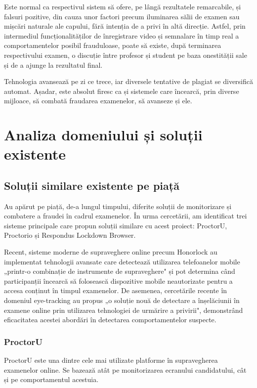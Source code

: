 \documentclass[12pt,a4paper]{article}
\begin{document}
Este normal ca respectivul sistem să ofere, pe lângă rezultatele
remarcabile, și falsuri pozitive, din cauza unor factori precum
iluminarea sălii de examen sau mișcări naturale ale capului, fără
intenția de a privi în altă direcție. Astfel, prin intermediul
funcționalităților de înregistrare video și semnalare în timp real a
comportamentelor posibil frauduloase, poate să existe, după terminarea
respectivului examen, o discuție între profesor și student pe baza
onestității sale și de a ajunge la rezultatul final. 

Tehnologia avansează pe zi ce trece, iar diversele tentative de plagiat se diversifică automat.
Așadar, este absolut firesc ca și sistemele care încearcă, prin
diverse mijloace, să combată fraudarea examenelor, să avanseze și ele.

\section{Analiza domeniului și soluții existente}

\subsection{Soluții similare existente pe piață}

Au apărut pe piață, de-a lungul timpului, diferite soluții de
monitorizare și combatere a fraudei în cadrul examenelor. În urma cercetării, am identificat
trei sisteme principale care propun soluții similare cu acest proiect: ProctorU\cite{proctoru}, 
Proctorio\cite{proctorio} și Respondus Lockdown Browser\cite{respondus}.

Recent, sisteme moderne de supraveghere online precum Honorlock au implementat tehnologii avansate 
care detectează utilizarea telefoanelor mobile „printr-o combinație de instrumente de supraveghere" și pot
determina când participanții încearcă să folosească dispozitive mobile neautorizate pentru a accesa 
conținut în timpul examenelor\cite{honorlock2023detecting}. De asemenea, cercetările recente în domeniul 
eye-tracking au propus „o soluție nouă de detectare a înșelăciunii în examene online prin utilizarea 
tehnologiei de urmărire a privirii"\cite{dilini2021cheating}, demonstrând eficacitatea acestei abordări
în detectarea comportamentelor suspecte.

\subsubsection{ProctorU}
ProctorU este una dintre cele mai utilizate platforme în
supravegherea examenelor online. Se bazează atât pe monitorizarea
ecranului candidatului, cât și pe comportamentul acestuia. 
\end{document}
